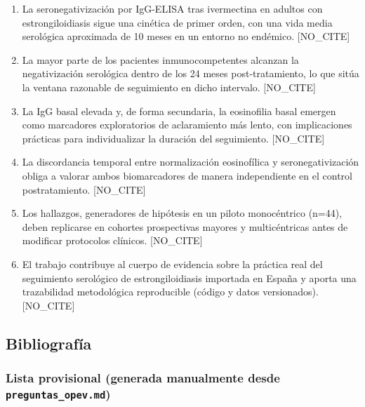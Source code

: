 \documentclass[
  spanish,
  12pt,
  a4paper,
]{article}
\begin{document}
\begin{enumerate}
\def\labelenumi{\arabic{enumi}.}
\item
  La seronegativización por IgG-ELISA tras ivermectina en adultos con
  estrongiloidiasis sigue una cinética de primer orden, con una vida
  media serológica aproximada de 10 meses en un entorno no endémico.
  {[}NO\_CITE{]}
\item
  La mayor parte de los pacientes inmunocompetentes alcanzan la
  negativización serológica dentro de los 24 meses post-tratamiento, lo
  que sitúa la ventana razonable de seguimiento en dicho intervalo.
  {[}NO\_CITE{]}
\item
  La IgG basal elevada y, de forma secundaria, la eosinofilia basal
  emergen como marcadores exploratorios de aclaramiento más lento, con
  implicaciones prácticas para individualizar la duración del
  seguimiento. {[}NO\_CITE{]}
\item
  La discordancia temporal entre normalización eosinofílica y
  seronegativización obliga a valorar ambos biomarcadores de manera
  independiente en el control postratamiento. {[}NO\_CITE{]}
\item
  Los hallazgos, generadores de hipótesis en un piloto monocéntrico
  (n=44), deben replicarse en cohortes prospectivas mayores y
  multicéntricas antes de modificar protocolos clínicos. {[}NO\_CITE{]}
\item
  El trabajo contribuye al cuerpo de evidencia sobre la práctica real
  del seguimiento serológico de estrongiloidiasis importada en España y
  aporta una trazabilidad metodológica reproducible (código y datos
  versionados). {[}NO\_CITE{]}
\end{enumerate}

\newpage

\subsection*{Bibliografía}\label{bibliografuxeda}

\subsubsection{\texorpdfstring{Lista provisional (generada manualmente
desde
\texttt{preguntas\_opev.md})}{Lista provisional (generada manualmente desde preguntas\_opev.md)}}\label{lista-provisional-generada-manualmente-desde-preguntas_opev.md}
\end{document}
